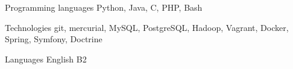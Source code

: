 
\begin{cvskills}

  \cvskill
    {Programming languages} %
    {Python, Java, C, PHP, Bash} %

  \cvskill
    {Technologies} %
    {git, mercurial, MySQL, PostgreSQL, Hadoop, Vagrant, Docker, Spring, Symfony, Doctrine} %

  \cvskill
    {Languages} %
    {English B2} %

\end{cvskills}
